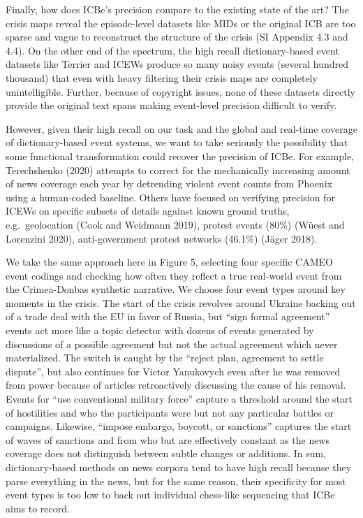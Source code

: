 \documentclass{article}
\begin{document}
Finally, how does ICBe's precision compare to the existing state of the
art? The crisis maps reveal the episode-level datasets like MIDs or the
original ICB are too sparse and vague to reconstruct the structure of
the crisis (SI Appendix 4.3 and 4.4). On the other end of the spectrum,
the high recall dictionary-based event datasets like Terrier and ICEWs
produce so many noisy events (several hundred thousand) that even with
heavy filtering their crisis maps are completely unintelligible.
Further, because of copyright issues, none of these datasets directly
provide the original text spans making event-level precision difficult
to verify.

However, given their high recall on our task and the global and
real-time coverage of dictionary-based event systems, we want to take
seriously the possibility that some functional transformation could
recover the precision of ICBe. For example, Terechshenko (2020) attempts
to correct for the mechanically increasing amount of news coverage each
year by detrending violent event counts from Phoenix using a human-coded
baseline. Others have focused on verifying precision for ICEWs on
specific subsets of details against known ground truths,
e.g.~geolocation (Cook and Weidmann 2019), protest events (80\%) (Wüest
and Lorenzini 2020), anti-government protest networks (46.1\%) (Jäger
2018).

We take the same approach here in Figure 5, selecting four specific
CAMEO event codings and checking how often they reflect a true
real-world event from the Crimea-Donbas synthetic narrative. We choose
four event types around key moments in the crisis. The start of the
crisis revolves around Ukraine backing out of a trade deal with the EU
in favor of Russia, but ``sign formal agreement'' events act more like a
topic detector with dozens of events generated by discussions of a
possible agreement but not the actual agreement which never
materialized. The switch is caught by the ``reject plan, agreement to
settle dispute'', but also continues for Victor Yanukovych even after he
was removed from power because of articles retroactively discussing the
cause of his removal. Events for ``use conventional military force''
capture a threshold around the start of hostilities and who the
participants were but not any particular battles or campaigns. Likewise,
``impose embargo, boycott, or sanctions'' captures the start of waves of
sanctions and from who but are effectively constant as the news coverage
does not distinguish between subtle changes or additions. In sum,
dictionary-based methods on news corpora tend to have high recall
because they parse everything in the news, but for the same reason,
their specificity for most event types is too low to back out individual
chess-like sequencing that ICBe aims to record.
\end{document}
